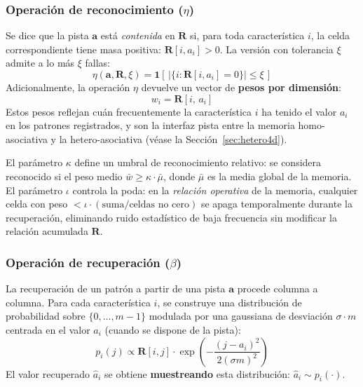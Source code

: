 \subsubsection*{Operación de reconocimiento ($\eta$)}

Se dice que la pista $\mathbf{a}$ está \emph{contenida} en $\mathbf{R}$ si, para toda
característica $i$, la celda correspondiente tiene masa positiva: $\mathbf{R}[i, a_i] > 0$.
La versión con tolerancia $\xi$ admite a lo más $\xi$ fallas:
\begin{equation}
    \eta(\mathbf{a}, \mathbf{R}, \xi) = \mathbf{1}\!\left[\,\bigl|\{i : \mathbf{R}[i, a_i] = 0\}\bigr| \leq \xi\,\right]
    \label{eq:reconocimiento}
\end{equation}
Adicionalmente, la operación $\eta$ devuelve un vector de \textbf{pesos por dimensión}:
\begin{equation}
    w_i = \mathbf{R}[i,\, a_i]
    \label{eq:pesos}
\end{equation}
Estos pesos reflejan cuán frecuentemente la característica $i$ ha tenido el valor $a_i$ en los
patrones registrados, y son la interfaz pista entre la memoria homo-asociativa y la
hetero-asociativa (véase la Sección~\ref{sec:hetero4d}).

El parámetro $\kappa$ define un umbral de reconocimiento relativo: se considera
reconocido si el peso medio $\bar{w} \geq \kappa \cdot \bar{\mu}$, donde $\bar{\mu}$ es
la media global de la memoria.
El parámetro $\iota$ controla la poda: en la \emph{relación operativa} de la memoria,
cualquier celda con peso $< \iota \cdot (\text{suma}/\text{celdas no cero})$ se
apaga temporalmente durante la recuperación, eliminando ruido estadístico de baja
frecuencia sin modificar la relación acumulada $\mathbf{R}$.

\subsubsection*{Operación de recuperación ($\beta$)}

La recuperación de un patrón a partir de una pista $\mathbf{a}$ procede columna a columna.
Para cada característica $i$, se construye una distribución de probabilidad sobre $\{0,\ldots,m-1\}$
modulada por una gaussiana de desviación $\sigma \cdot m$ centrada en el valor $a_i$
(cuando se dispone de la pista):
\begin{equation}
    p_i(j) \propto \mathbf{R}[i, j] \cdot \exp\!\left(-\frac{(j - a_i)^2}{2(\sigma m)^2}\right)
    \label{eq:distribucion-recuperacion}
\end{equation}
El valor recuperado $\hat{a}_i$ se obtiene \textbf{muestreando} esta distribución:
$\hat{a}_i \sim p_i(\cdot)$.

